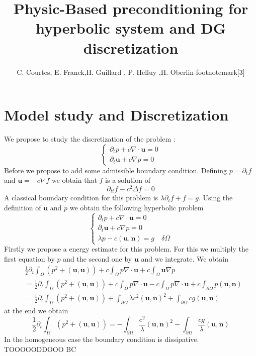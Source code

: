 \documentclass[a4paper,twoside,french,english,11pt]{article}
\title{Physic-Based preconditioning for hyperbolic system and DG discretization}
\author{C. Courtes\footnotemark[4], E. Franck\footnotemark[1],\quad H. Guillard \footnotemark[3], \quad P. Helluy \footnotemark[3],H. Oberlin footnotemark[3]}
\newcommand{\ds}{\displaystyle}
\newcommand{\dt}{\partial_t}
\begin{document}
\maketitle


\tableofcontents

\section{Model study and Discretization}
We propose to study the discretization of the problem :
$$
\left\{\begin{array}{l}
\ds \dt p+c\nabla \cdot \bm{u}=0\\
\ds \dt \bm{u}+c\nabla p = 0 \end{array}\right.
$$
Before we propose to add some admissible boundary condition. Defining $p=\dt f$ and $\bm{u}=- c\nabla f$ we obtain that $f$ is a solution of 
$$
\partial_{tt} f-c^2\Delta f=0
$$
A classical boundary condition for this problem is $\lambda \dt f+f=g$. Using the definition of $\bm{u}$ and $p$ we obtain the following hyperbolic problem
$$
\left\{\begin{array}{l}
\ds \dt p+c\nabla \cdot \bm{u}=0\\
\ds \dt \bm{u}+c\nabla p = 0 \\
\lambda p-c  (\bm{u},\bm{n})=g\quad \delta \Omega \end{array}\right.
$$
Firstly we propose a energy estimate for this problem. For this we multiply the first equation by $p$ and the second one by $\bm{u}$ and we integrate. We obtain
\begin{align*}
& \frac{1}{2}\dt\int_{\Omega}(p^2+(\bm{u},\bm{u}))+c\int_{\Omega}p\nabla \cdot \bm{u} + c\int_{\Omega} \bm{u} \nabla p\\
&=  \frac{1}{2}\dt \int_{\Omega}(p^2+(\bm{u},\bm{u}))+c\int_{\Omega}p\nabla \cdot \bm{u} - c\int_{\Omega}p\nabla \cdot \bm{u}+c\int_{\partial \Omega} p (\bm{u},\bm{n})\\
&=  \frac{1}{2}\dt \int_{\Omega}(p^2+(\bm{u},\bm{u}))+\int_{\partial \Omega} \lambda c^2 (\bm{u},\bm{n})^2+ \int_{\partial \Omega} c g (\bm{u},\bm{n})
\end{align*}
at the end we obtain
$$
\frac{1}{2}\dt \int_{\Omega}(p^2+(\bm{u},\bm{u}))=-\int_{\partial \Omega} \frac{c^2}{\lambda} (\bm{u},\bm{n})^2- \int_{\partial \Omega} \frac{c g}{\lambda} (\bm{u},\bm{n})
$$
In the homogeneous case the boundary condition is dissipative.
TOOOOODDOOO BC 
\end{document}
